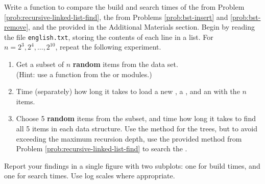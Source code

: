 \begin{problem} %
\label{prob:binary-trees-compare-times}
Write a function to compare the build and search times of the  from Problem \ref{prob:recursive-linked-list-find}, the  from Problems \ref{prob:bst-insert} and \ref{prob:bst-remove}, and the  provided in the Additional Materials section.
Begin by reading the file \texttt{english.txt}, storing the contents of each line in a list.
For $n=2^3,2^4,\ldots,2^{10}$, repeat the following experiment.
\begin{enumerate}
\item Get a subset of $n$ \textbf{random} items from the data set.
\\(Hint: use a function from the  or  modules.)
\item Time (separately) how long it takes to load a new , a , and an  with the $n$ items.
\item Choose 5 \textbf{random} items from the subset, and time how long it takes to find all 5 items in each data structure.
Use the  method for the trees, but to avoid exceeding the maximum recursion depth, use the provided  method from Problem \ref{prob:recursive-linked-list-find} to search the .
\end{enumerate}
Report your findings in a single figure with two subplots: one for build times, and one for search times.
Use log scales where appropriate.

\begin{comment} %
Your figure should resemble the following plots.
%
\begin{figure}[H] %
    \centering
    \begin{subfigure}[b]{.49\textwidth}
        \centering
        \texttt{[image: figures/BuildTimes.pdf]}
    \end{subfigure}%
    \begin{subfigure}[b]{.49\textwidth}
        \centering
        \texttt{[image: figures/SearchTimes.pdf]}
    \end{subfigure}
\end{figure}
\end{comment}
\end{problem}

